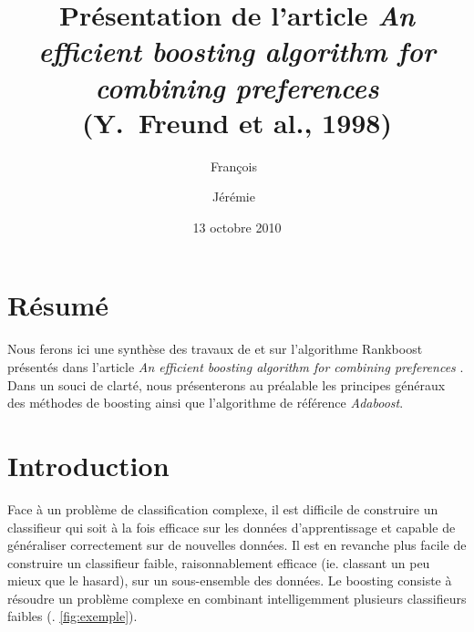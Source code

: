 \documentclass[pdftex,a4paper,11pt]{article}
\begin{document}
\title{Présentation de l'article \emph{An efficient boosting algorithm for combining preferences} \\ 
       (Y.~Freund et al., 1998)}

\author{François~ \and Jérémie~}
\date{13 octobre 2010}


\maketitle


\section{Résumé}

Nous ferons ici une synthèse des travaux de  et  sur l'algorithme Rankboost présentés dans l'article \emph{An efficient boosting algorithm for combining preferences} \cite{freund1998efficient}. Dans un souci de clarté, nous présenterons au préalable les principes généraux des méthodes de boosting ainsi que l'algorithme de référence \emph{Adaboost}.


\section{Introduction}

Face à un problème de classification complexe, il est difficile de construire un classifieur qui soit à la fois efficace sur les données d’apprentissage et  capable de généraliser correctement sur de nouvelles données.
Il est en revanche plus facile de construire un classifieur \og{}faible\fg{}, raisonnablement efficace (ie. classant un peu mieux que le hasard), sur un sous-ensemble des données.
Le boosting consiste à résoudre un problème complexe en combinant intelligemment plusieurs classifieurs faibles (. \ref{fig:exemple}).
\end{document}
